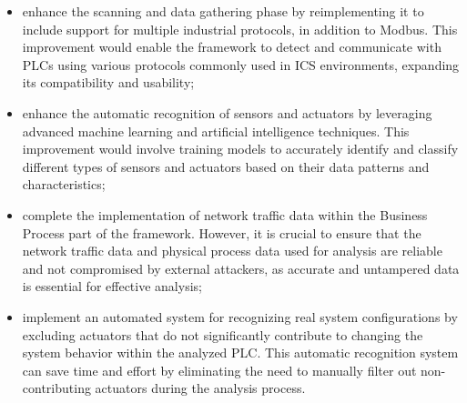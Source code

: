 \begin{itemize}
	\item enhance the scanning and data gathering phase by reimplementing it to include support for multiple industrial protocols, in addition to Modbus. This improvement would enable the framework to detect and communicate with PLCs using various protocols commonly used in ICS environments, expanding its compatibility and usability;
	
	\item enhance the automatic recognition of sensors and actuators by leveraging advanced machine learning and artificial intelligence techniques. This improvement would involve training models to accurately identify and classify different types of sensors and actuators based on their data patterns and characteristics;
	
	\item complete the implementation of network traffic data within the Business Process part of the framework. However, it is crucial to ensure that the network traffic data and physical process data used for analysis are reliable and not compromised by external attackers, as accurate and untampered data is essential for effective analysis;
	
	\item implement an automated system for recognizing real system configurations by excluding actuators that do not significantly contribute to changing the system behavior within the analyzed PLC. This automatic recognition system can save time and effort by eliminating the need to manually filter out non-contributing actuators during the analysis process.
\end{itemize}

\vfill
\nolinenumbers